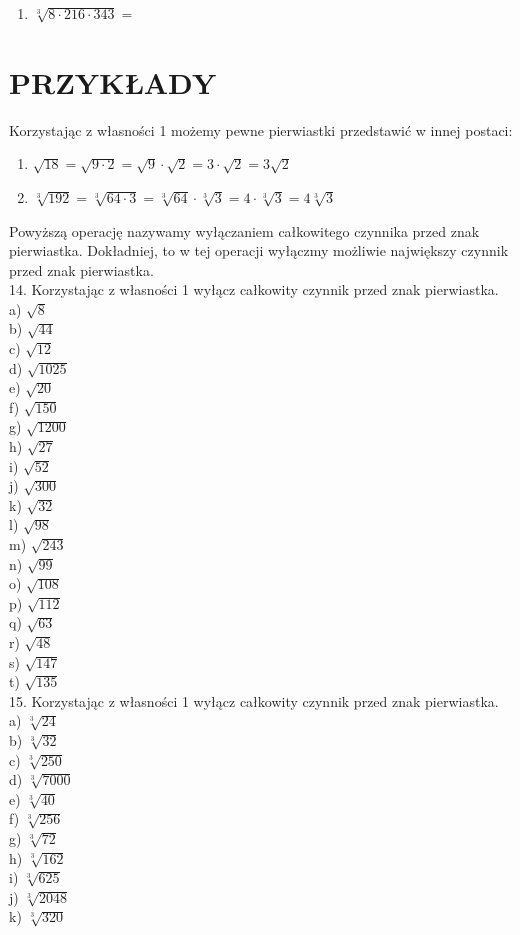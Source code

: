 \documentclass[10pt]{article}
\begin{document}
\begin{enumerate}
  \item \(\sqrt[3]{8 \cdot 216 \cdot 343}=\)
\end{enumerate}

\section*{PRZYKŁADY}
Korzystając z własności 1 możemy pewne pierwiastki przedstawić w innej postaci:

\begin{enumerate}
  \item \(\sqrt{18}=\sqrt{9 \cdot 2}=\sqrt{9} \cdot \sqrt{2}=3 \cdot \sqrt{2}=3 \sqrt{2}\)
  \item \(\sqrt[3]{192}=\sqrt[3]{64 \cdot 3}=\sqrt[3]{64} \cdot \sqrt[3]{3}=4 \cdot \sqrt[3]{3}=4 \sqrt[3]{3}\)
\end{enumerate}

Powyższą operację nazywamy wyłączaniem całkowitego czynnika przed znak pierwiastka. Dokładniej, to w tej operacji wyłączmy możliwie największy czynnik przed znak pierwiastka.\\
14. Korzystając z własności 1 wyłącz całkowity czynnik przed znak pierwiastka.\\
a) \(\sqrt{8}\)\\
b) \(\sqrt{44}\)\\
c) \(\sqrt{12}\)\\
d) \(\sqrt{1025}\)\\
e) \(\sqrt{20}\)\\
f) \(\sqrt{150}\)\\
g) \(\sqrt{1200}\)\\
h) \(\sqrt{27}\)\\
i) \(\sqrt{52}\)\\
j) \(\sqrt{300}\)\\
k) \(\sqrt{32}\)\\
l) \(\sqrt{98}\)\\
m) \(\sqrt{243}\)\\
n) \(\sqrt{99}\)\\
o) \(\sqrt{108}\)\\
p) \(\sqrt{112}\)\\
q) \(\sqrt{63}\)\\
r) \(\sqrt{48}\)\\
s) \(\sqrt{147}\)\\
t) \(\sqrt{135}\)\\
15. Korzystając z własności 1 wyłącz całkowity czynnik przed znak pierwiastka.\\
a) \(\sqrt[3]{24}\)\\
b) \(\sqrt[3]{32}\)\\
c) \(\sqrt[3]{250}\)\\
d) \(\sqrt[3]{7000}\)\\
e) \(\sqrt[3]{40}\)\\
f) \(\sqrt[3]{256}\)\\
g) \(\sqrt[3]{72}\)\\
h) \(\sqrt[3]{162}\)\\
i) \(\sqrt[3]{625}\)\\
j) \(\sqrt[3]{2048}\)\\
k) \(\sqrt[3]{320}\)
\end{document}
